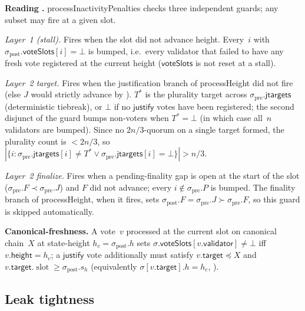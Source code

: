 \ifx\litemode\undefined\documentclass{article}\fi
\newcommand{\slot}[0]{\ensuremath{\operatorname{\mathrm{slot}}}}
\newcommand{\target}{\mathsf{target}}
\newcommand{\height}{\mathsf{height}}
\newcommand{\validator}{\mathsf{validator}}
\newcommand{\just}{\ensuremath{\mathsf{justify}}\xspace}
\newcommand{\jtargets}{\mathsf{jtargets}}
\newcommand{\voteSlots}{\mathsf{voteSlots}}
\newcommand{\processHeight}{\textsf{processHeight}\xspace}
\newcommand{\processInactivityPenalties}{\textsf{processInactivityPenalties}\xspace}
\renewcommand{\paragraph}[1]{\vspace{7pt}\noindent\textbf{#1}}
\theoremstyle{plain}
\theoremstyle{definition}
\theoremstyle{remark}
\begin{document}
\paragraph{Reading .}
\processInactivityPenalties checks three independent guards; any subset may fire at a given slot.

\emph{Layer~1 (stall).} Fires when the slot did not advance height.
Every~$i$ with $\sigma_{\mathrm{post}}.\voteSlots[i] = \bot$ is bumped, i.e.\ every validator that failed to have any fresh vote registered at the current height ($\voteSlots$ is not reset at a stall).

\emph{Layer~2 target.} Fires when the justification branch of \processHeight did not fire (else $J$ would strictly advance by ).
$T^*$ is the plurality target across $\sigma_{\mathrm{pre}}.\jtargets$ (deterministic tiebreak), or $\bot$ if no \just votes have been registered; the second disjunct of the guard bumps non-voters when $T^* = \bot$ (in which case all~$n$ validators are bumped).
Since no $2n/3$-quorum on a single target formed, the plurality count is $< 2n/3$, so $|\{i : \sigma_{\mathrm{pre}}.\jtargets[i] \neq T^* \vee \sigma_{\mathrm{pre}}.\jtargets[i] = \bot\}| > n/3$.

\emph{Layer~2 finalize.} Fires when a pending-finality gap is open at the start of the slot ($\sigma_{\mathrm{pre}}.F \prec \sigma_{\mathrm{pre}}.J$) and $F$ did not advance; every $i \notin \sigma_{\mathrm{pre}}.P$ is bumped.
The finality branch of \processHeight, when it fires, sets $\sigma_{\mathrm{post}}.F = \sigma_{\mathrm{pre}}.J \succ \sigma_{\mathrm{pre}}.F$, so this guard is skipped automatically.

\paragraph{Canonical-freshness.}
A vote~$v$ processed at the current slot on canonical chain~$X$ at state-height $h_c = \sigma_{\mathrm{post}}.h$ sets $\sigma.\voteSlots[v.\validator] \neq \bot$ iff $v.\height = h_c$; a \just vote additionally must satisfy $v.\target \preceq X$ and $v.\target.\slot \geq \sigma_{\mathrm{post}}.s_h$ (equivalently $\sigma[v.\target].h = h_c$, ).

\subsection{Leak tightness}
\end{document}
